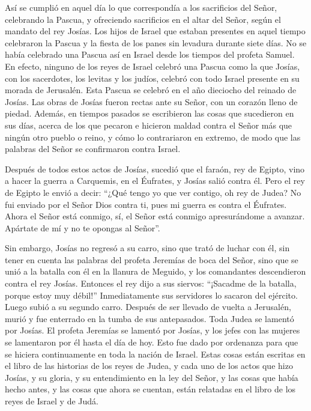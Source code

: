  Así se cumplió en aquel día lo que correspondía a los
sacrificios del Señor, celebrando la Pascua,  y
ofreciendo sacrificios en el altar del Señor, según el mandato del rey
Josías.  Los hijos de Israel que estaban presentes en
aquel tiempo celebraron la Pascua y la fiesta de los panes sin levadura
durante siete días.  No se había celebrado una Pascua así
en Israel desde los tiempos del profeta Samuel.  En
efecto, ninguno de los reyes de Israel celebró una Pascua como la que
Josías, con los sacerdotes, los levitas y los judíos, celebró con todo
Israel presente en su morada de Jerusalén.  Esta Pascua
se celebró en el año dieciocho del reinado de Josías. 
Las obras de Josías fueron rectas ante su Señor, con un corazón lleno de
piedad.  Además, en tiempos pasados se escribieron las
cosas que sucedieron en sus días, acerca de los que pecaron e hicieron
maldad contra el Señor más que ningún otro pueblo o reino, y cómo lo
contrariaron en extremo, de modo que las palabras del Señor se
confirmaron contra Israel.

 Después de todos estos actos de Josías, sucedió que el
faraón, rey de Egipto, vino a hacer la guerra a Carquemis, en el
Éufrates, y Josías salió contra él.  Pero el rey de
Egipto le envió a decir: ``¿Qué tengo yo que ver contigo, oh rey de
Judea?  No fui enviado por el Señor Dios contra ti, pues
mi guerra es contra el Éufrates. Ahora el Señor está conmigo, sí, el
Señor está conmigo apresurándome a avanzar. Apártate de mí y no te
opongas al Señor''.

 Sin embargo, Josías no regresó a su carro, sino que
trató de luchar con él, sin tener en cuenta las palabras del profeta
Jeremías de boca del Señor,  sino que se unió a la
batalla con él en la llanura de Meguido, y los comandantes descendieron
contra el rey Josías.  Entonces el rey dijo a sus
siervos: ``¡Sacadme de la batalla, porque estoy muy débil!''
Inmediatamente sus servidores lo sacaron del ejército. 
Luego subió a su segundo carro. Después de ser llevado de vuelta a
Jerusalén, murió y fue enterrado en la tumba de sus antepasados.
 Toda Judea se lamentó por Josías. El profeta Jeremías se
lamentó por Josías, y los jefes con las mujeres se lamentaron por él
hasta el día de hoy. Esto fue dado por ordenanza para que se hiciera
continuamente en toda la nación de Israel.  Estas cosas
están escritas en el libro de las historias de los reyes de Judea, y
cada uno de los actos que hizo Josías, y su gloria, y su entendimiento
en la ley del Señor, y las cosas que había hecho antes, y las cosas que
ahora se cuentan, están relatadas en el libro de los reyes de Israel y
de Judá.

